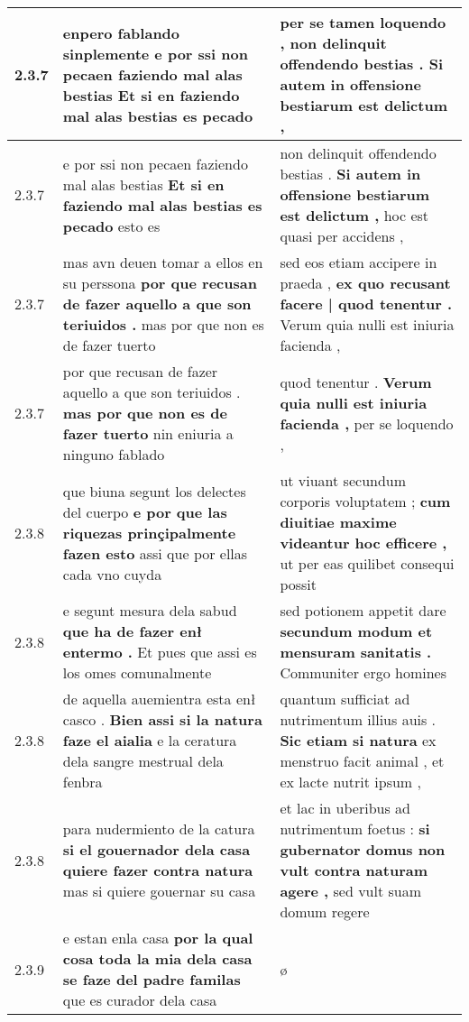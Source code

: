 \begin{tabular}{|p{1cm}|p{6.5cm}|p{6.5cm}|}
2.3.7 & enpero fablando sinplemente \textbf{ e por ssi non pecaen faziendo mal alas bestias } Et si en faziendo mal alas bestias es pecado & per se tamen loquendo , \textbf{ non delinquit offendendo bestias . } Si autem in offensione bestiarum est delictum , \\\hline
2.3.7 & e por ssi non pecaen faziendo mal alas bestias \textbf{ Et si en faziendo mal alas bestias es pecado } esto es & non delinquit offendendo bestias . \textbf{ Si autem in offensione bestiarum est delictum , } hoc est quasi per accidens , \\\hline
2.3.7 & mas avn deuen tomar a ellos en su perssona \textbf{ por que recusan de fazer aquello a que son teriuidos . } mas por que non es de fazer tuerto & sed eos etiam accipere in praeda , \textbf{ ex quo recusant facere | quod tenentur . } Verum quia nulli est iniuria facienda , \\\hline
2.3.7 & por que recusan de fazer aquello a que son teriuidos . \textbf{ mas por que non es de fazer tuerto } nin eniuria a ninguno fablado & quod tenentur . \textbf{ Verum quia nulli est iniuria facienda , } per se loquendo , \\\hline
2.3.8 & que biuna segunt los delectes del cuerpo \textbf{ e por que las riquezas prinçipalmente fazen esto } assi que por ellas cada vno cuyda & ut viuant secundum corporis voluptatem ; \textbf{ cum diuitiae maxime videantur hoc efficere , } ut per eas quilibet consequi possit \\\hline
2.3.8 & e segunt mesura dela sabud \textbf{ que ha de fazer enł entermo . } Et pues que assi es los omes comunalmente & sed potionem appetit dare \textbf{ secundum modum et mensuram sanitatis . } Communiter ergo homines \\\hline
2.3.8 & de aquella auemientra esta enł casco . \textbf{ Bien assi si la natura faze el aialia } e la ceratura dela sangre mestrual dela fenbra & quantum sufficiat ad nutrimentum illius auis . \textbf{ Sic etiam si natura } ex menstruo facit animal , et ex lacte nutrit ipsum , \\\hline
2.3.8 & para nudermiento de la catura \textbf{ si el gouernador dela casa quiere fazer contra natura } mas si quiere gouernar su casa & et lac in uberibus ad nutrimentum foetus : \textbf{ si gubernator domus non vult contra naturam agere , } sed vult suam domum regere \\\hline
2.3.9 & e estan enla casa \textbf{ por la qual cosa toda la mia dela casa se faze del padre familas } que es curador dela casa & ø \\\hline

\end{tabular}
